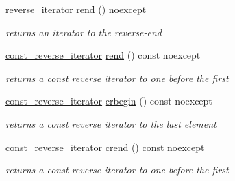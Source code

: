 \begin{DoxyCompactItemize}
\mbox{\hyperlink{classnlohmann_1_1basic__json_ac223d5560c2b05a208c88de67376c5f2}{reverse\+\_\+iterator}} \mbox{\hyperlink{classnlohmann_1_1basic__json_ac77aed0925d447744676725ab0b6d535}{rend}} () noexcept
\begin{DoxyCompactList}\small\item\em returns an iterator to the reverse-\/end \end{DoxyCompactList}\item 
\mbox{\hyperlink{classnlohmann_1_1basic__json_a72be3c24bfa24f0993d6c11af03e7404}{const\+\_\+reverse\+\_\+iterator}} \mbox{\hyperlink{classnlohmann_1_1basic__json_a4f73d4cee67ea328d785979c22af0ae1}{rend}} () const noexcept
\begin{DoxyCompactList}\small\item\em returns a const reverse iterator to one before the first \end{DoxyCompactList}\item 
\mbox{\hyperlink{classnlohmann_1_1basic__json_a72be3c24bfa24f0993d6c11af03e7404}{const\+\_\+reverse\+\_\+iterator}} \mbox{\hyperlink{classnlohmann_1_1basic__json_a1e0769d22d54573f294da0e5c6abc9de}{crbegin}} () const noexcept
\begin{DoxyCompactList}\small\item\em returns a const reverse iterator to the last element \end{DoxyCompactList}\item 
\mbox{\hyperlink{classnlohmann_1_1basic__json_a72be3c24bfa24f0993d6c11af03e7404}{const\+\_\+reverse\+\_\+iterator}} \mbox{\hyperlink{classnlohmann_1_1basic__json_a5795b029dbf28e0cb2c7a439ec5d0a88}{crend}} () const noexcept
\begin{DoxyCompactList}\small\item\em returns a const reverse iterator to one before the first \end{DoxyCompactList}\end{DoxyCompactItemize}
